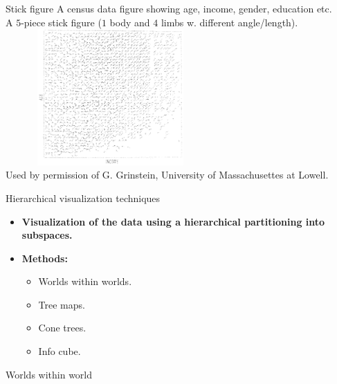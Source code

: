 \documentclass[aspectratio=169,t]{beamer}
\begin{document}
  { 
    \begin{frame}{Stick figure}
    A census data figure showing age, income, gender, education etc. \\
    A $5$-piece stick figure ($1$ body and $4$ limbs w. different angle/length).\\[0.1cm]
    \centering
    \includegraphics[width=8cm, height=5.2cm]{img/stick_figure.png}\\
    \tiny{Used by permission of G. Grinstein, University of Massachusettes at Lowell.}
    \end{frame}
  }

  { 
    \begin{frame}{Hierarchical visualization techniques}
    \centering
    \begin{itemize}
      \item \textbf{Visualization of the data using a hierarchical partitioning into subspaces.}
      \item \textbf{Methods:}
      \begin{itemize}
        \item Worlds within worlds.
        \item Tree maps.
        \item Cone trees.
        \item Info cube.
      \end{itemize}
    \end{itemize}
    \end{frame}
  }

  { 
    \begin{frame}{Worlds within world}
    \centering
    
    \end{frame}
  }
\end{document}
